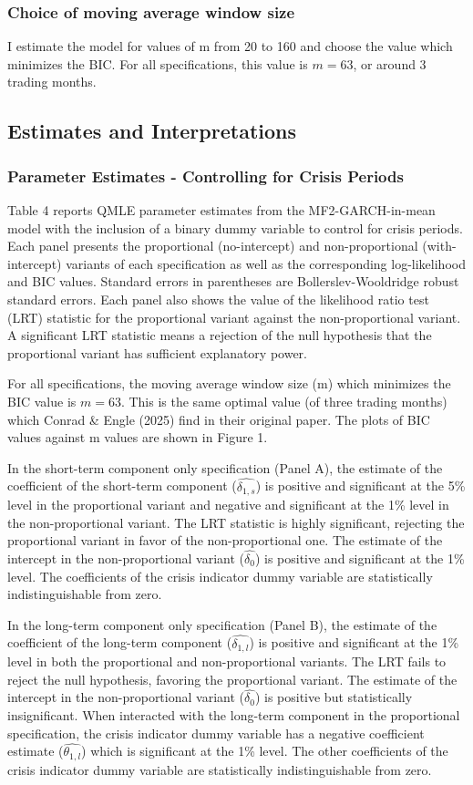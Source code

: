 \documentclass[12pt]{article}
\begin{document}
\subsubsection{Choice of moving average window size}
I estimate the model for values of m from 20 to 160 and choose the value which minimizes the BIC. For all specifications, this value is $m=63$, or around 3 trading months.
\subsection{Estimates and Interpretations}
\subsubsection{Parameter Estimates - Controlling for Crisis Periods}
Table 4 reports QMLE parameter estimates from the MF2-GARCH-in-mean model with the inclusion of a binary dummy variable to control for crisis periods. Each panel presents the proportional (no-intercept) and non-proportional (with-intercept) variants of each specification as well as the corresponding log-likelihood and BIC values. Standard errors in parentheses are Bollerslev-Wooldridge robust standard errors. Each panel also shows the value of the likelihood ratio test (LRT) statistic for the proportional variant against the non-proportional variant. A significant LRT statistic means a rejection of the null hypothesis that the proportional variant has sufficient explanatory power.\par
For all specifications, the moving average window size (m) which minimizes the BIC value is $m=63$.  This is the same optimal value (of three trading months) which Conrad \& Engle (2025) find in their original paper. The plots of BIC values against m values are shown in Figure 1.\par
In the short-term component only specification (Panel A), the estimate of the coefficient of the short-term component ($\widehat{\delta_{1,s}}$) is positive and significant at the 5\% level in the proportional variant and negative and significant at the 1\% level in the non-proportional variant. The LRT statistic is highly significant, rejecting the proportional variant in favor of the non-proportional one. The estimate of the intercept in the non-proportional variant ($\widehat{\delta_0}$) is positive and significant at the 1\% level. The coefficients of the crisis indicator dummy variable are statistically indistinguishable from zero.\par
In the long-term component only specification (Panel B), the estimate of the coefficient of the long-term component ($\widehat{\delta_{1,l}}$) is positive and significant at the 1\% level in both the proportional and non-proportional variants. The LRT fails to reject the null hypothesis, favoring the proportional variant. The estimate of the intercept in the non-proportional variant ($\widehat{\delta_0}$) is positive but statistically insignificant.  When interacted with the long-term component in the proportional specification, the crisis indicator dummy variable has a negative coefficient estimate ($\widehat{\theta_{1,l}}$) which is significant at the 1\% level. The other coefficients of the crisis indicator dummy variable are statistically indistinguishable from zero.\par
\end{document}
